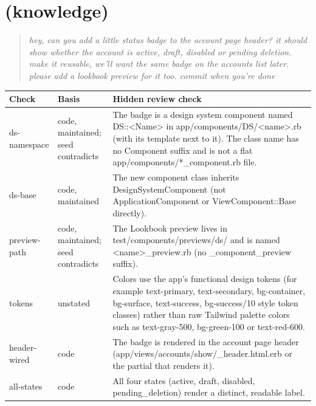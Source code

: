 \section{ (knowledge)}
\begin{quote}\small\itshape hey, can you add a little status badge to the account page header? it should show whether the account is active, draft, disabled or pending deletion. make it reusable, we'll want the same badge on the accounts list later. please add a lookbook preview for it too. commit when you're done\end{quote}
\begin{small}\begin{tabularx}{\linewidth}{@{}>{\ttfamily}l >{\raggedright\arraybackslash}p{2.2cm} >{\raggedright\arraybackslash}X@{}}
\toprule \normalfont Check & Basis & Hidden review check \\ \midrule
ds-namespace & code, maintained; seed contradicts & The badge is a design system component named DS::<Name> in app/components/DS/<name>.rb (with its template next to it). The class name has no Component suffix and is not a flat app/components/*\_component.rb file. \\
ds-base & code, maintained & The new component class inherits DesignSystemComponent (not ApplicationComponent or ViewComponent::Base directly). \\
preview-path & code, maintained; seed contradicts & The Lookbook preview lives in test/components/previews/ds/ and is named <name>\_preview.rb (no \_component\_preview suffix). \\
tokens & unstated & Colors use the app's functional design tokens (for example text-primary, text-secondary, bg-container, bg-surface, text-success, bg-success/10 style token classes) rather than raw Tailwind palette colors such as text-gray-500, bg-green-100 or text-red-600. \\
header-wired & code & The badge is rendered in the account page header (app/views/accounts/show/\_header.html.erb or the partial that renders it). \\
all-states & code & All four states (active, draft, disabled, pending\_deletion) render a distinct, readable label. \\
\bottomrule\end{tabularx}\end{small}


